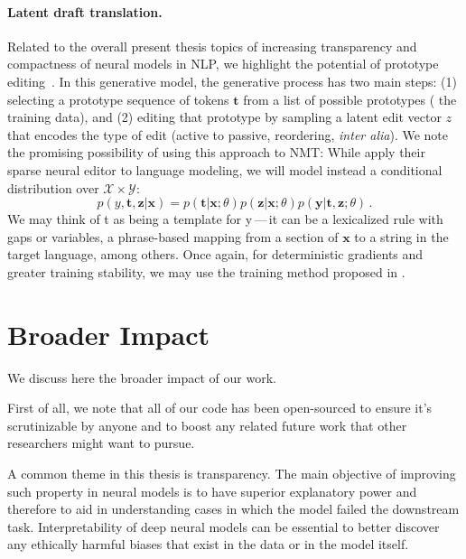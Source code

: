 \paragraph*{Latent draft translation.} Related to the overall present
thesis topics of increasing transparency and compactness of neural
models in NLP, we highlight the potential of prototype
editing~\citep{guu2018GeneratingSentencesEditing,
    he2020LearningSparsePrototypes}. In this generative model, the
generative process has two main steps: (1) selecting a prototype
sequence of tokens $\bm{t}$ from a list of possible prototypes (\eg
the training data), and (2) editing that prototype by sampling a latent
edit vector $z$ that encodes the type of edit (\eg active to passive,
reordering, \textit{inter alia}). We note the promising possibility
of using this approach to NMT: While \citep{he2020LearningSparsePrototypes} apply their
sparse neural editor to language modeling, we will model instead a
conditional distribution over $\mathcal{X} \times \mathcal{Y}$:
%
\begin{equation}
    p(y, \bm{t}, \bm{z} | \bm{x}) =
    p(\bm{t} | \bm{x}; \theta)
    p(\bm{z} | \bm{x}; \theta)
    p(\bm{y} | \bm{t}, \bm{z}; \theta)\,.
\end{equation}
%
We may think of t as being a template for y\,---\,it can be a
lexicalized rule with gaps or variables, a phrase-based mapping
from a section of $\bm x$ to a string in the target language, among others.
Once again, for deterministic gradients and greater training stability, we
may use the training method proposed in .

\section{Broader Impact}\label{sec:impact}

\noindent We discuss here the broader impact of our work.

First of all, we note that all of our code has been
open-sourced to ensure it's scrutinizable by
anyone and to boost any related future work that other researchers
might want to pursue.

A common theme in this thesis is transparency.
The main objective of improving such property in neural models
is to have superior explanatory power and therefore to aid in understanding cases
in which the model failed the downstream task. Interpretability of
deep neural models can be essential to better discover any ethically
harmful biases that exist in the data or in the model itself.

